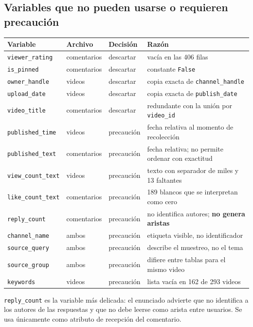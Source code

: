 \documentclass[11pt,a4paper]{article}
\begin{document}
\subsection{Variables que no pueden usarse o requieren precauci\'on}
\begin{longtable}{l l l p{6.6cm}}
\toprule
\textbf{Variable} & \textbf{Archivo} & \textbf{Decisi\'on} & \textbf{Raz\'on} \\
\midrule
\endhead
\texttt{viewer\_rating} & comentarios & descartar & vac\'ia en las 406 filas \\
\texttt{is\_pinned} & comentarios & descartar & constante \texttt{False} \\
\texttt{owner\_handle} & videos & descartar & copia exacta de \texttt{channel\_handle} \\
\texttt{upload\_date} & videos & descartar & copia exacta de \texttt{publish\_date} \\
\texttt{video\_title} & comentarios & descartar & redundante con la uni\'on por \texttt{video\_id} \\
\texttt{published\_time} & videos & precauci\'on & fecha relativa al momento de recolecci\'on \\
\texttt{published\_text} & comentarios & precauci\'on & fecha relativa; no permite ordenar con exactitud \\
\texttt{view\_count\_text} & videos & precauci\'on & texto con separador de miles y 13 faltantes \\
\texttt{like\_count\_text} & comentarios & precauci\'on & 189 blancos que se interpretan como cero \\
\texttt{reply\_count} & comentarios & precauci\'on & no identifica autores; \textbf{no genera aristas} \\
\texttt{channel\_name} & ambos & precauci\'on & etiqueta visible, no identificador \\
\texttt{source\_query} & ambos & precauci\'on & describe el muestreo, no el tema \\
\texttt{source\_group} & ambos & precauci\'on & difiere entre tablas para el mismo video \\
\texttt{keywords} & videos & precauci\'on & lista vac\'ia en 162 de 293 videos \\
\bottomrule
\end{longtable}

\texttt{reply\_count} es la variable m\'as delicada: el enunciado advierte que no identifica a los
autores de las respuestas y que no debe leerse como arista entre usuarios. Se usa \'unicamente como
atributo de recepci\'on del comentario.
\end{document}
